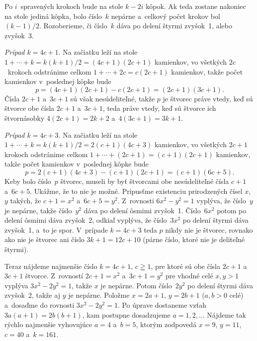 {%
Po $i$~spravených krokoch bude na stole $k-2i$ kôpok.
Ak teda zostane nakoniec na stole jediná kôpka, bolo číslo~$k$
nepárne a~celkový počet krokov bol $(k-1)/2$. Rozoberieme, či číslo~$k$
dáva po delení štyrmi zvyšok~1, alebo zvyšok~3.

{\it Prípad $k=4c+1$}. Na začiatku leží na stole
$1+\cdots+k=k(k+1)/2=(4c+1)(2c+1)$ kamienkov, vo všetkých $2c$~krokoch
odstránime celkom $1+\cdots+2c=c(2c+1)$ kamienkov, takže
počet kamienkov v~poslednej kôpke bude
$$
p=(4c+1)(2c+1)-c(2c+1)=(2c+1)(3c+1).
$$
Čísla $2c+1$ a~$3c+1$ sú však nesúdeliteľné, takže $p$ je štvorec
práve vtedy, keď sú štvorce obe čísla $2c+1$ 
a~$3c+1$, teda práve vtedy, keď sú štvorce ich štvornásobky
$4(2c+1)=2k+2$ a~$4(3c+1)=3k+1$.

{\it Prípad $k=4c+3$}. Na začiatku leží na stole
$1+\cdots+k=k(k+1)/2=2(c+1)(4c+3)$ kamienkov, vo všetkých $2c+1$
krokoch odstránime celkom $1+\cdots+(2c+1)=(c+1)(2c+1)$ kamienkov, takže
počet kamienkov v~poslednej kôpke bude
$$
p=2(c+1)(4c+3)-(c+1)(2c+1)=(c+1)(6c+5).
$$
Keby bolo číslo~$p$ štvorec, museli by byť štvorcami
obe nesúdeliteľné čísla $c+1$ a~$6c+5$. Ukážme, že to nie je
možné. Pripusťme existenciu prirodzených čísel $x$, $y$ takých, že
$c+1=x^2$ a~$6c+5=y^2$. Z~rovnosti $6x^2-y^2=1$ vyplýva, že číslo~$y$
je nepárne, takže číslo~$y^2$ dáva po delení ôsmimi zvyšok~1.
Číslo~$6x^2$ potom po delení ôsmimi dáva zvyšok~2, odkiaľ vyplýva, že
číslo~$3x^2$ po delení štyrmi dáva zvyšok~1, a~to je spor.
V~prípade $k=4c+3$ teda $p$ nikdy nie je štvorec, rovnako ako
nie je štvorec ani číslo $3k+1=12c+10$ (párne číslo, ktoré nie je
deliteľné štyrmi).

Teraz nájdeme najmenšie číslo $k=4c+1$, $c\geqq1$, pre ktoré sú
obe čísla $2c+1$ a~$3c+1$ štvorce. Z~rovností $2c+1=x^2$ 
a~$3c+1=y^2$ pre vhodné celé $x,y>1$ vyplýva $3x^2-2y^2=1$, takže $x$
je nepárne. Potom číslo~$2y^2$ po delení štyrmi dáva zvyšok~2, takže
aj $y$ je nepárne. Položme $x=2a+1$, $y=2b+1$ ($a,b>0$ celé) 
a~dosaďme do rovnosti $3x^2-2y^2=1$. Po úprave dostaneme vzťah
$3a(a+1)=2b(b+1)$, kam postupne dosadzujeme $a=1,2,\dots$
Nájdeme tak rýchlo najmenšie vyhovujúce $a=4$ a~$b=5$, ktorým
zodpovedá $x=9$, $y=11$, $c=40$ a~$k=161$.}

